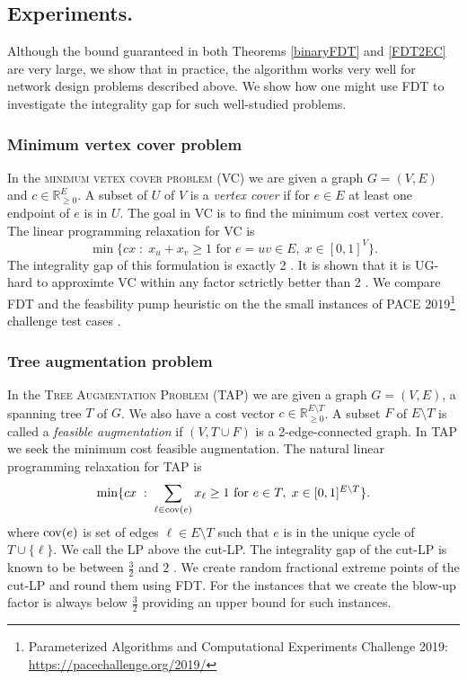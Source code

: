 \subsection{Experiments.} Although the bound guaranteed in both Theorems \ref{binaryFDT} and \ref{FDT2EC} are very large, we show that in practice, the algorithm works very well for network design problems described above. We show how one might use FDT to investigate the integrality gap for such well-studied problems. 


\subsubsection{Minimum vertex cover problem}

In the \textsc{minimum vetex cover problem (VC)} we are given a graph $G=(V,E)$ and $c\in \mathbb{R}^E_{\geq 0}$. A subset of $U$ of $V$ is a \textit{vertex cover} if for $e\in E$ at least one endpoint of $e$ is in $U$. The goal in VC is to find the minimum cost vertex cover. The linear programming relaxation for VC is
\begin{equation}
\min \{cx \; : \; x_u + x_v \geq	 1 \text{ for } e=uv \in E, \; x\in [0,1]^{V}\}.
\end{equation}
The integrality gap of this formulation is exactly 2 \cite{davids}.   It is shown that it is UG-hard to approximte VC within any factor sctrictly better than 2 \cite{UGhardVC}.  We compare  FDT and the feasbility pump heuristic \cite{fp1} on the the small instances of PACE 2019\footnote{ Parameterized Algorithms and Computational Experiments Challenge 2019: \url{https://pacechallenge.org/2019/}} challenge test cases \cite{PACE}. 
\subsubsection{Tree augmentation problem}
In the \textsc{Tree Augmentation Problem (TAP)} we are given a  graph $G=(V,E)$, a spanning tree $T$ of $G$. We also have a cost vector $c\in \mathbb{R}^{E\setminus T}_{\geq 0}$. A subset $F$ of $E\setminus T$ is called a \textit{feasible augmentation} if $(V,T\cup F)$ is a 2-edge-connected graph. In TAP we seek the minimum cost feasible augmentation. The natural linear programming relaxation for TAP is 
\begin{equation}
\min \{cx\; : \; \sum_{\ell \in \mathrm{cov}(e)} x_{\ell} \geq 1 \text{ for } e\in T, \; x\in [0,1]^{E\setminus T}\}.
\end{equation}
where $\mathrm{cov}(e)$ is set of edges $\ell \in E\setminus T$ such that $e$ is in the unique cycle of $T\cup \{\ell\}$. We call the LP above the cut-LP. The integrality gap of the cut-LP is known to be between $\frac{3}{2}$ \cite{32gaptap} and $2$ \cite{FJ81}. We create random fractional extreme points of the cut-LP and round them using FDT. For the instances that we create the blow-up factor is always below $\frac{3}{2}$ providing an upper bound for such instances.

